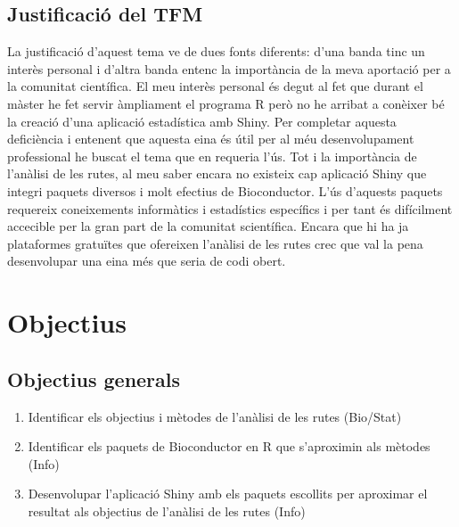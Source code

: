 \documentclass[]{article}
\begin{document}
\subsection{Justificació del TFM}
La justificació d'aquest tema ve de dues fonts diferents: d'una banda tinc un interès personal i d'altra banda entenc la importància de la meva aportació per a la comunitat científica. El meu interès personal és degut al fet que durant el màster he fet servir àmpliament el programa R però no he arribat a conèixer bé la creació d'una aplicació estadística amb Shiny. Per completar aquesta deficiència i entenent que aquesta eina és útil per al méu desenvolupament professional he buscat el tema que en requeria l'ús. Tot i la importància de l'anàlisi de les rutes, al meu saber encara no existeix cap aplicació Shiny que integri paquets diversos i molt efectius de Bioconductor. L'ús d'aquests paquets requereix coneixements informàtics i estadístics específics i per tant és difícilment accecible per la gran part de la comunitat scientífica. Encara que hi ha ja plataformes gratuïtes que ofereixen l'anàlisi de les rutes \cite{reimand2019pathway} crec que val la pena desenvolupar una eina més que seria de codi obert.

\section{Objectius}
\subsection{Objectius generals}
\begin{enumerate}
\item Identificar els objectius i mètodes de l'anàlisi de les rutes (Bio/Stat)
\item Identificar els paquets de Bioconductor en R que s'aproximin als mètodes (Info)
\item Desenvolupar l'aplicació Shiny  amb els paquets escollits per aproximar el resultat als objectius de l'anàlisi de les rutes  (Info)
\end{enumerate}
\end{document}
